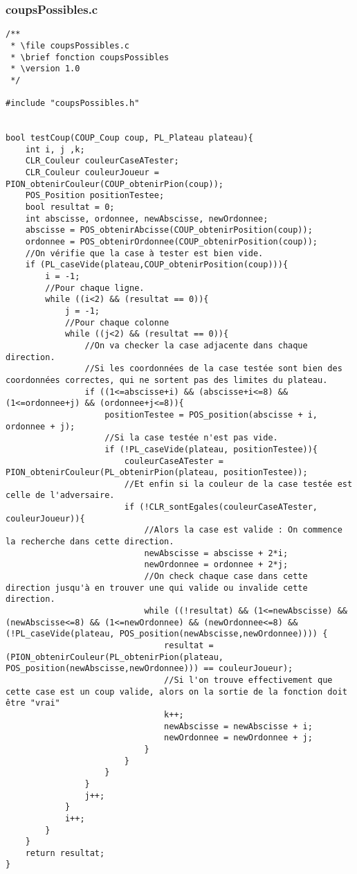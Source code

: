 \subsubsection{coupsPossibles.c}
\begin{lstlisting}
/**
 * \file coupsPossibles.c
 * \brief fonction coupsPossibles
 * \version 1.0
 */

#include "coupsPossibles.h"


bool testCoup(COUP_Coup coup, PL_Plateau plateau){
    int i, j ,k;
    CLR_Couleur couleurCaseATester;
    CLR_Couleur couleurJoueur = PION_obtenirCouleur(COUP_obtenirPion(coup));
    POS_Position positionTestee;
    bool resultat = 0;
    int abscisse, ordonnee, newAbscisse, newOrdonnee;
    abscisse = POS_obtenirAbcisse(COUP_obtenirPosition(coup));
    ordonnee = POS_obtenirOrdonnee(COUP_obtenirPosition(coup));
    //On vérifie que la case à tester est bien vide.
    if (PL_caseVide(plateau,COUP_obtenirPosition(coup))){
        i = -1;
        //Pour chaque ligne.
        while ((i<2) && (resultat == 0)){
            j = -1;
            //Pour chaque colonne
            while ((j<2) && (resultat == 0)){
                //On va checker la case adjacente dans chaque direction.
                //Si les coordonnées de la case testée sont bien des coordonnées correctes, qui ne sortent pas des limites du plateau.
                if ((1<=abscisse+i) && (abscisse+i<=8) && (1<=ordonnee+j) && (ordonnee+j<=8)){
                    positionTestee = POS_position(abscisse + i, ordonnee + j);
                    //Si la case testée n'est pas vide.
                    if (!PL_caseVide(plateau, positionTestee)){
                        couleurCaseATester = PION_obtenirCouleur(PL_obtenirPion(plateau, positionTestee));
                        //Et enfin si la couleur de la case testée est celle de l'adversaire.
                        if (!CLR_sontEgales(couleurCaseATester, couleurJoueur)){
                            //Alors la case est valide : On commence la recherche dans cette direction.
                            newAbscisse = abscisse + 2*i;
                            newOrdonnee = ordonnee + 2*j;
                            //On check chaque case dans cette direction jusqu'à en trouver une qui valide ou invalide cette direction.
                            while ((!resultat) && (1<=newAbscisse) && (newAbscisse<=8) && (1<=newOrdonnee) && (newOrdonnee<=8) && (!PL_caseVide(plateau, POS_position(newAbscisse,newOrdonnee)))) {
                                resultat = (PION_obtenirCouleur(PL_obtenirPion(plateau, POS_position(newAbscisse,newOrdonnee))) == couleurJoueur);
                                //Si l'on trouve effectivement que cette case est un coup valide, alors on la sortie de la fonction doit être "vrai"
                                k++;
                                newAbscisse = newAbscisse + i;
                                newOrdonnee = newOrdonnee + j;
                            }
                        }
                    }
                }
                j++;
            }
            i++;
        }
    }
    return resultat;
}


\end{lstlisting}
